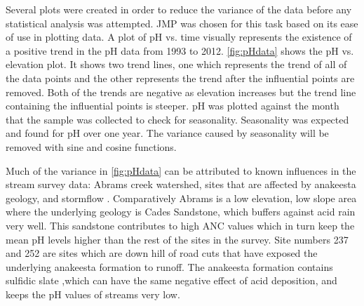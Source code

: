 Several plots were created in order to reduce the variance of the data before any statistical analysis was attempted. 
JMP was chosen for this task based on its ease of use in plotting data. 
A plot of pH vs. time visually represents the existence of a positive trend in the pH data from 1993 to 2012.
\autoref{fig:pHdata} shows the pH vs. elevation plot. 
It shows two trend lines, one which represents the trend of all of the data points and the other represents the trend after the influential points are removed. 
Both of the trends are negative as elevation increases but the trend line containing the influential points is steeper. 
pH was plotted against the month that the sample was collected to check for seasonality. 
Seasonality was expected and found for pH over one year. 
The variance caused by seasonality will be removed with sine and cosine functions.

Much of the variance in \autoref{fig:pHdata} can be attributed to known influences in the stream survey data: Abrams creek watershed, sites that are affected by anakeesta geology, and stormflow \citep{neff2012influence}.  
Comparatively Abrams is a low elevation, low slope area where the underlying geology is Cades Sandstone, which buffers against acid rain very well. 
This sandstone contributes to high ANC values which in turn keep the mean pH levels higher than the rest of the sites in the survey. 
Site numbers 237 and 252 are sites which are down hill of road cuts that have exposed the underlying anakeesta formation to runoff.  
The anakeesta formation contains sulfidic slate ,which can have the same negative effect of acid deposition,  and keeps the pH values of streams very low.

